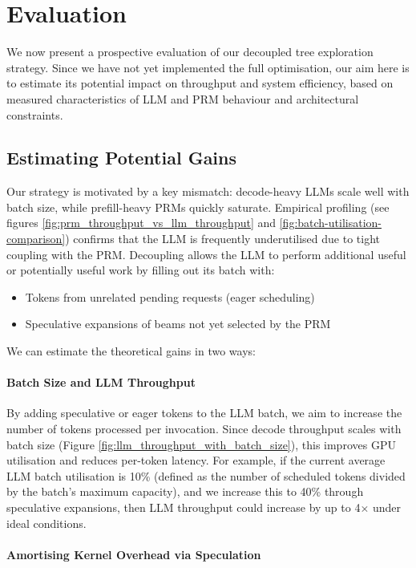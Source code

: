 \documentclass[12pt,twoside]{report}
\begin{document}
\section{Evaluation}

We now present a prospective evaluation of our decoupled tree exploration strategy. 
Since we have not yet implemented the full optimisation, our aim here is to estimate its potential impact on throughput and system efficiency, based on measured characteristics of LLM and PRM behaviour and architectural constraints.

\subsection{Estimating Potential Gains}

Our strategy is motivated by a key mismatch: decode-heavy LLMs scale well with batch size, while prefill-heavy PRMs quickly saturate. 
Empirical profiling (see figures \ref{fig:prm_throughput_vs_llm_throughput} and \ref{fig:batch-utilisation-comparison}) confirms that the LLM is frequently underutilised due to tight coupling with the PRM. 
Decoupling allows the LLM to perform additional useful or potentially useful work by filling out its batch with:
\begin{itemize}
  \item Tokens from unrelated pending requests (eager scheduling)
  \item Speculative expansions of beams not yet selected by the PRM
\end{itemize}

We can estimate the theoretical gains in two ways:

\paragraph{Batch Size and LLM Throughput}

By adding speculative or eager tokens to the LLM batch, we aim to increase the number of tokens processed per invocation. 
Since decode throughput scales with batch size (Figure \ref{fig:llm_throughput_with_batch_size}), this improves GPU utilisation and reduces per-token latency. 
For example, if the current average LLM batch utilisation is 10\% (defined as the number of scheduled tokens divided by the batch’s maximum capacity), and we increase this to 40\% through speculative expansions, then LLM throughput could increase by up to 4$\times$ under ideal conditions.

\paragraph{Amortising Kernel Overhead via Speculation}
\end{document}

